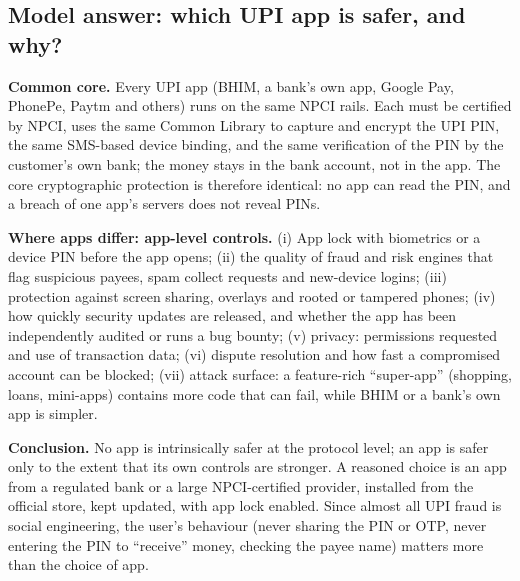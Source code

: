 \subsection{Model answer: which UPI app is safer, and why? \new}

\begin{keybox}[title={Model answer}]
\textbf{Common core.} Every UPI app (BHIM, a bank's own app, Google Pay, PhonePe, Paytm and others) runs on the same NPCI rails. Each must be certified by NPCI, uses the same Common Library to capture and encrypt the UPI PIN, the same SMS-based device binding, and the same verification of the PIN by the customer's own bank; the money stays in the bank account, not in the app. The core cryptographic protection is therefore identical: no app can read the PIN, and a breach of one app's servers does not reveal PINs.

\textbf{Where apps differ: app-level controls.} (i) App lock with biometrics or a device PIN before the app opens; (ii) the quality of fraud and risk engines that flag suspicious payees, spam collect requests and new-device logins; (iii) protection against screen sharing, overlays and rooted or tampered phones; (iv) how quickly security updates are released, and whether the app has been independently audited or runs a bug bounty; (v) privacy: permissions requested and use of transaction data; (vi) dispute resolution and how fast a compromised account can be blocked; (vii) attack surface: a feature-rich ``super-app'' (shopping, loans, mini-apps) contains more code that can fail, while BHIM or a bank's own app is simpler.

\textbf{Conclusion.} No app is intrinsically safer at the protocol level; an app is safer only to the extent that its own controls are stronger. A reasoned choice is an app from a regulated bank or a large NPCI-certified provider, installed from the official store, kept updated, with app lock enabled. Since almost all UPI fraud is social engineering, the user's behaviour (never sharing the PIN or OTP, never entering the PIN to ``receive'' money, checking the payee name) matters more than the choice of app.
\end{keybox}

